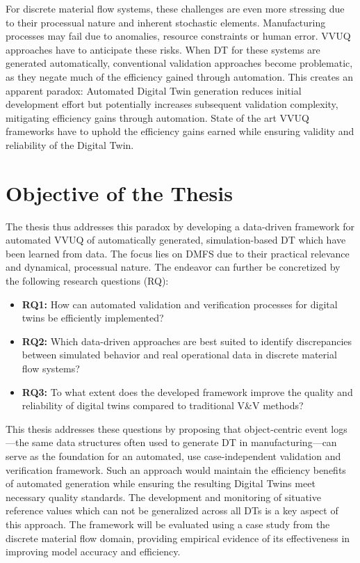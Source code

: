 For discrete material flow systems, these challenges are even more stressing due to their processual nature and inherent stochastic elements. Manufacturing processes may fail due to anomalies, resource constraints or human error. VVUQ approaches have to anticipate these risks. When DT for these systems are generated automatically, conventional validation approaches become problematic, as they negate much of the efficiency gained through automation. This creates an apparent paradox: Automated Digital Twin generation reduces initial development effort but potentially increases subsequent validation complexity, mitigating efficiency gains through automation. State of the art VVUQ frameworks have to uphold the efficiency gains earned while ensuring validity and reliability of the Digital Twin.

\section{Objective of the Thesis}

The thesis thus addresses this paradox by developing a data-driven framework for automated VVUQ of automatically generated, simulation-based DT which have been learned from data. The focus lies on DMFS due to their practical relevance and dynamical, processual nature. The endeavor can further be concretized by the following research questions (RQ):

\begin{itemize}
  \item \textbf{RQ1:} How can automated validation and verification processes for digital twins be efficiently implemented?
  \item \textbf{RQ2:} Which data-driven approaches are best suited to identify discrepancies between simulated behavior and real operational data in discrete material flow systems?
  \item \textbf{RQ3:} To what extent does the developed framework improve the quality and reliability of digital twins compared to traditional V&V methods?
\end{itemize}

This thesis addresses these questions by proposing that object-centric event logs—the same data structures often used to generate DT in manufacturing—can serve as the foundation for an automated, use case-independent validation and verification framework. Such an approach would maintain the efficiency benefits of automated generation while ensuring the resulting Digital Twins meet necessary quality standards. The development and monitoring of situative reference values which can not be generalized across all DTs is a key aspect of this approach. The framework will be evaluated using a case study from the discrete material flow domain, providing empirical evidence of its effectiveness in improving model accuracy and efficiency.

